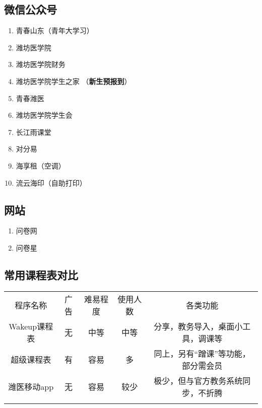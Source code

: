 {\begin{minipage}{.5\textwidth}
        \subsection[微信公众号]{微信公众号}
        \begin{enumerate}
            \item 青春山东（青年大学习）
            \item 潍坊医学院
            \item 潍坊医学院财务
            \item 潍坊医学院学生之家
                  （\textbf{新生预报到}）
            \item 青春潍医
            \item 潍坊医学院学生会
            \item 长江雨课堂
            \item 对分易
            \item 海享租（空调）
            \item 流云海印（自助打印）
        \end{enumerate}

        \subsection[网站]{网站}
        \begin{enumerate}
            \item 问卷网
            \item 问卷星
        \end{enumerate}
    \end{minipage}
    \vspace*{-1em}
}

\subsection[常用课程表对比]{常用课程表对比}
\label{schedule}
\begin{center}
    \centering
    \begin{tabular}{|c|c|c|c|c|}
        \Xhline{1.2pt}
        程序名称      & 广告 & 难易程度 & 使用人数 & 各类功能                \\
        \Xhline{1.2pt}
        Wakeup课程表 & 无  & 中等   & 中等   & 分享，教务导入，桌面小工具，调课等 \\
        \hline
        超级课程表     & 有  & 容易   & 多    & 同上，另有“蹭课”等功能，部分需会员  \\
        \hline
        潍医移动app   & 无  & 容易   & 较少   & 极少，但与官方教务系统同步，不折腾   \\
        \Xhline{1.2pt}
    \end{tabular}
\end{center}

